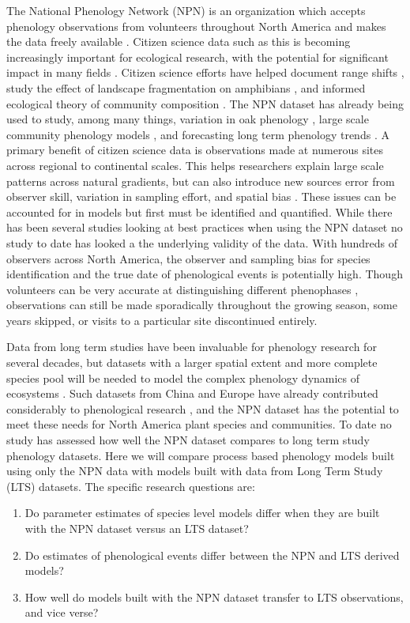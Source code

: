 \documentclass[fleqn,10pt,lineno]{wlpeerj} %
\begin{document}
The National Phenology Network (NPN) is an organization which accepts phenology observations from volunteers throughout North America and makes the data freely available \citep{schwartz2012a}. Citizen science data such as this is becoming increasingly important for ecological research, with the potential for significant impact in many fields \citep{dickinson2010, tulloch2013, kelling2009}. Citizen science efforts have helped document range shifts \citep{hitch2007}, study the effect of landscape fragmentation on amphibians \citep{cosentino2014}, and informed ecological theory of community composition \citep{locey2013}. The NPN dataset has already being used to study, among many things, variation in oak phenology \citep{gerst2017}, large scale community phenology models \citep{melaas2016}, and forecasting long term phenology trends \citep{jeong2013}. A primary benefit of citizen science data is observations made at numerous sites across regional to continental scales. This helps researchers explain large scale patterns across natural gradients, but can also introduce new sources error from observer skill, variation in sampling effort, and spatial bias \citep{dickinson2010}. These issues can be accounted for in models but first must be identified and quantified. While there has been several studies looking at best practices when using the NPN dataset \citep{crimmins2017, gerst2016} no study to date has looked a the underlying validity of the data. With hundreds of observers across North America, the observer and sampling bias for species identification and the true date of phenological events is potentially high. Though volunteers can be very accurate at distinguishing different phenophases \citep{fuccillo2015}, observations can still be made sporadically throughout the growing season, some years skipped, or visits to a particular site discontinued entirely. 

Data from long term studies have been invaluable for phenology research for several decades, but datasets with a larger spatial extent and more complete species pool will be needed to model the complex phenology dynamics of ecosystems \citep{richardson2012, diez2012, caradonna2014}. Such datasets from China and Europe have already contributed considerably to phenological research \citep{olsson2014, basler2016, xu2013, zhang2017}, and the NPN dataset has the potential to meet these needs for North America plant species and communities. To date no study has assessed how well the NPN dataset compares to long term study phenology datasets. Here we will compare process based phenology models built using only the NPN data with models built with data from Long Term Study (LTS) datasets. The specific research questions are:
\begin{enumerate}
\item Do parameter estimates of species level models differ when they are built with the NPN dataset versus an LTS dataset?
\item Do estimates of phenological events differ between the NPN and LTS derived models?
\item How well do models built with the NPN dataset transfer to LTS observations, and vice verse?
\end{enumerate}
\end{document}
